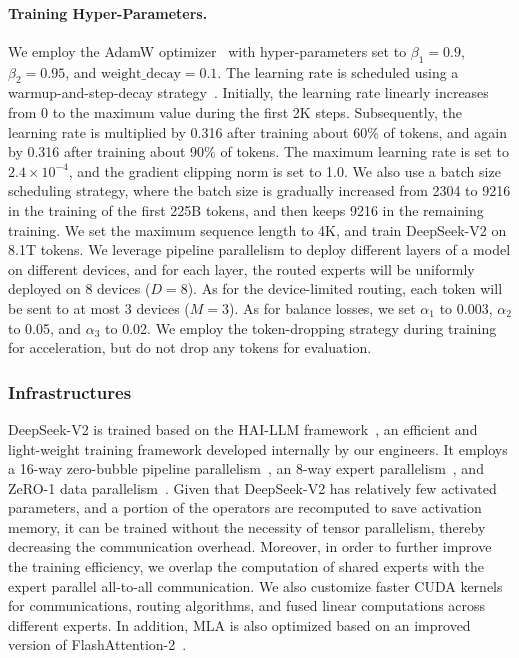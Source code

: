 \documentclass[11pt, a4paper, logo, copyright, nonumbering]{deepseek}
\newcommand{\dsvii}{DeepSeek-V2}
\newcommand{\dsattn}{MLA}
\begin{document}
\begin{CJK*}{UTF8}{gbsn}
\paragraph{Training Hyper-Parameters.}
We employ the AdamW optimizer~\citep{adamw} with hyper-parameters set to $\beta_1=0.9$, $\beta_2=0.95$, and $\mathrm{weight\_decay}=0.1$. 
The learning rate is scheduled using a warmup-and-step-decay strategy~\citep{deepseek1}. 
Initially, the learning rate linearly increases from 0 to the maximum value during the first 2K steps. 
Subsequently, the learning rate is multiplied by 0.316 after 
training about 60\% of tokens, and again by 0.316 after training about 90\% of tokens. 
The maximum learning rate is set to $2.4 \times 10^{-4}$, and the gradient clipping norm is set to 1.0.
We also use a batch size scheduling strategy, where the batch size is gradually increased from 2304 to 9216 in the training of the first 225B tokens, and then keeps 9216 in the remaining training. 
We set the maximum sequence length to 4K, and train \dsvii{} on 8.1T tokens. 
We leverage pipeline parallelism to deploy different layers of a model on different devices, and for each layer, the routed experts will be uniformly deployed on 8 devices ($D=8$). 
As for the device-limited routing, each token will be sent to at most 3 devices ($M=3$). 
As for balance losses, we set $\alpha_{1}$ to 0.003, $\alpha_{2}$ to 0.05, and $\alpha_{3}$ to 0.02. 
We employ the token-dropping strategy during training for acceleration, but do not drop any tokens for evaluation. 

\subsubsection{Infrastructures}

\dsvii{} is trained based on the HAI-LLM framework~\citep{haillm}, an efficient and light-weight training framework developed internally by our engineers. 
It employs a 16-way zero-bubble pipeline parallelism~\citep{qi2023zero}, an 8-way expert parallelism~\citep{gshard}, and ZeRO-1 data parallelism~\citep{zero}. 
Given that \dsvii{} has relatively few activated parameters, and a portion of the operators are recomputed to save activation memory, it can be trained without the necessity of tensor parallelism, thereby decreasing the communication overhead. 
Moreover, in order to further improve the training efficiency, we overlap the computation of shared experts with the expert parallel all-to-all communication. 
We also customize faster CUDA kernels for communications, routing algorithms, and fused linear computations across different experts.
In addition, \dsattn{} is also optimized based on an improved version of FlashAttention-2~\citep{dao2023flashattention2}.


\end{CJK*}
\end{document}
